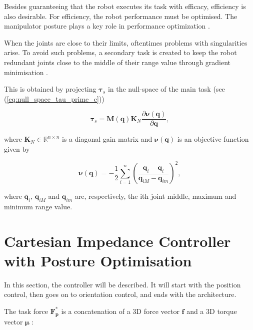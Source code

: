 Besides guaranteeing that the robot executes its task with efficacy, efficiency is also desirable. For efficiency, the robot performance must be optimised. The manipulator posture plays a key role in performance optimization \cite{Ochoa2019_control_architecture_robotic_polishing}. 

When the joints are close to their limits, oftentimes problems with singularities arise. To avoid such problems, a secondary task is created to keep the robot redundant joints close to the middle of their range value through gradient minimisation \cite{Santos2018_computed_torque_control_robotic_assisted_tele_ecography}.

This is obtained by projecting $\boldsymbol{\tau}_s$ in the null-space of the main task (see (\ref{eq:null_space_tau_prime_c}))

\begin{equation}
    \boldsymbol{\tau}_s = \boldsymbol{M}(\boldsymbol{q}) \boldsymbol{K}_N \frac{\partial\boldsymbol{\nu}(\boldsymbol{q})}{\partial\boldsymbol{q}},
\end{equation}

where $\boldsymbol{K}_N \in \mathbb{R}^{n\times n}$ is a diagonal gain matrix and $\boldsymbol{\nu}(\boldsymbol{q})$ is an objective function given by

\begin{equation}
    \boldsymbol{\nu}(\boldsymbol{q}) = - \frac{1}{2} \sum_{i=1}^{n}  \left(\frac{\boldsymbol{q}_i - \boldsymbol{\bar{q}}_i}{\boldsymbol{q}_{iM} - \boldsymbol{q}_{im}}\right)^2,
\end{equation}

where $\boldsymbol{\bar{q}}_i$, $\boldsymbol{q}_{iM}$ and $\boldsymbol{q}_{im}$ are, respectively, the ith joint middle, maximum and minimum range value.


\section{Cartesian Impedance Controller with Posture Optimisation}
\label{sec:control_architectures_cartesian_impedance_posture_optimisation}

In this section, the controller will be described. It will start with the position control, then goes on to orientation control, and ends with the architecture.

The task force $\boldsymbol{F^*_p}$ is a concatenation of a 3D force vector $\boldsymbol{f}$ and a 3D torque vector $\boldsymbol{\mu}$ \cite{Ochoa2019_control_architecture_robotic_polishing}:

